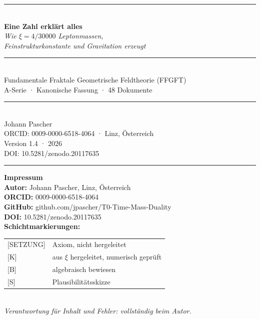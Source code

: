 \documentclass[11pt,twoside,openright]{book}
\begin{document}
\begin{titlepage}
\centering
\vspace*{1.6cm}
{\color{t0blue}\rule{\textwidth}{2pt}}\\[1.2cm]
{\Huge\bfseries\color{t0blue} Eine Zahl erklärt alles}\\[0.7cm]
{\large\color{t0orange}\itshape
  Wie $\xi = 4/30000$ Leptonmassen,\\[0.2em]
  Feinstrukturkonstante und Gravitation erzeugt
}\\[1.1cm]
{\color{t0blue}\rule{0.55\textwidth}{0.8pt}}\\[1.0cm]
{\normalsize\color{black}
  Fundamentale Fraktale Geometrische Feldtheorie (FFGFT)\\[0.2em]
  A-Serie · Kanonische Fassung · 48 Dokumente
}\\[1.2cm]
{\color{t0blue}\rule{0.55\textwidth}{0.8pt}}\\[1.0cm]
{\large Johann Pascher}\\[0.3cm]
{\small ORCID: 0009-0000-6518-4064 · Linz, Österreich}\\[0.2cm]
{\small Version 1.4 · 2026}\\[0.4cm]
{\small DOI: 10.5281/zenodo.20117635}\\[1.2cm]
{\color{t0blue}\rule{\textwidth}{2pt}}
\end{titlepage}

\thispagestyle{empty}
\vspace*{\fill}
{\small
\noindent\textbf{Impressum}\\[0.4em]
\textbf{Autor:} Johann Pascher, Linz, Österreich\\
\textbf{ORCID:} 0009-0000-6518-4064\\
\textbf{GitHub:} github.com/jpascher/T0-Time-Mass-Duality\\
\textbf{DOI:} 10.5281/zenodo.20117635\\[0.7em]
\textbf{Schichtmarkierungen:}\\[0.3em]
\begin{tabular}{@{}ll@{}}
{[SETZUNG]} & Axiom, nicht hergeleitet \\[2pt]
{[K]} & aus $\xi$ hergeleitet, numerisch geprüft \\[2pt]
{[B]} & algebraisch bewiesen \\[2pt]
{[S]} & Plausibilitätsskizze \\
\end{tabular}\\[0.7em]
\textit{Verantwortung für Inhalt und Fehler: vollständig beim Autor.}
}
\clearpage
\end{document}
